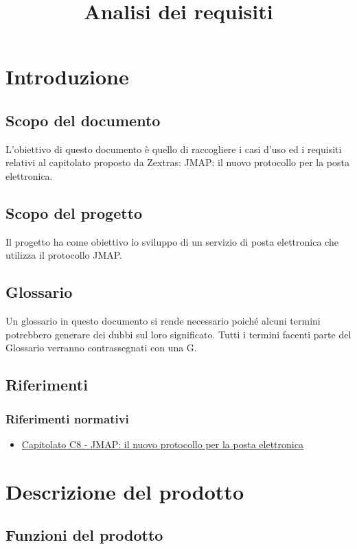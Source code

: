 \documentclass[12pt]{article}
\title{Analisi dei requisiti}
\begin{document}
	\makefirstpage
	
	
	\clearpage
	
	\tableofcontents
	\clearpage
	

	\section{Introduzione}
    	\subsection{Scopo del documento}
    		L'obiettivo di questo documento è quello di raccogliere i casi d’uso ed i requisiti relativi al capitolato proposto da Zextras: JMAP: il nuovo protocollo per la posta elettronica.
  
    
    	\subsection{Scopo del progetto}
    		Il progetto ha come obiettivo lo sviluppo di un servizio di posta elettronica che utilizza il protocollo JMAP.
    
    	\subsection{Glossario}
    		Un glossario in questo documento si rende necessario poiché alcuni termini potrebbero generare dei dubbi sul loro significato.
    		Tutti i termini facenti parte del Glossario verranno contrassegnati con una G.

    	\subsection{Riferimenti}
    		\subsubsection{Riferimenti normativi}
        		\begin{itemize}
            		\item \href{https://www.math.unipd.it/~tullio/IS-1/2023/Progetto/C8.pdf}{Capitolato C8 - JMAP: il nuovo protocollo per la posta elettronica}
        		\end{itemize}

	\section{Descrizione del prodotto}
    	\subsection{Funzioni del prodotto}




\end{document}
